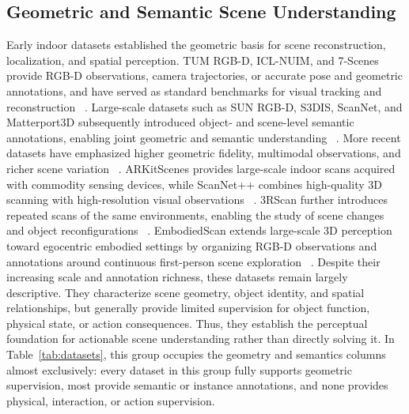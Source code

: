 \documentclass{SCIS2026}
\begin{document}
\subsection{Geometric and Semantic Scene Understanding}
\label{subsec:geometric_semantic_datasets} Early indoor datasets established the geometric basis for scene reconstruction, localization, and spatial perception. TUM RGB-D, ICL-NUIM, and 7-Scenes provide RGB-D observations, camera trajectories, or accurate pose and geometric annotations, and have served as standard benchmarks for visual tracking and reconstruction ~\cite{sturm2012benchmark,handa2014benchmark,shotton2013scene}. Large-scale datasets such as SUN RGB-D, S3DIS, ScanNet, and Matterport3D subsequently introduced object- and scene-level semantic annotations, enabling joint geometric and semantic understanding ~\cite{song2015sunrgbd,armeni20163d,dai2017scannet,chang2017matterport3d}. More recent datasets have emphasized higher geometric fidelity, multimodal observations, and richer scene variation ~\cite{straub2019replica,ling2024dl3dv}. ARKitScenes provides large-scale indoor scans acquired with commodity sensing devices, while ScanNet++ combines high-quality 3D scanning with high-resolution visual observations
~\cite{baruch2021arkitscenes,yeshwanth2023scannet++}. 3RScan further introduces repeated scans of the same environments, enabling the study of scene changes and object reconfigurations ~\cite{wald2019rio}. EmbodiedScan extends large-scale 3D perception toward
egocentric embodied settings by organizing RGB-D observations and annotations around continuous first-person scene exploration
~\cite{wang2024embodiedscan}. Despite their increasing scale and annotation richness, these datasets remain largely descriptive. They characterize scene geometry, object identity, and spatial relationships, but generally provide limited supervision for object
function, physical state, or action consequences. Thus, they establish the perceptual foundation for actionable scene understanding rather than directly solving it. In Table~\ref{tab:datasets}, this group occupies the geometry and semantics columns almost exclusively: every dataset in this group fully supports geometric supervision, most provide semantic or instance annotations, and none provides physical, interaction, or action supervision.
\end{document}
